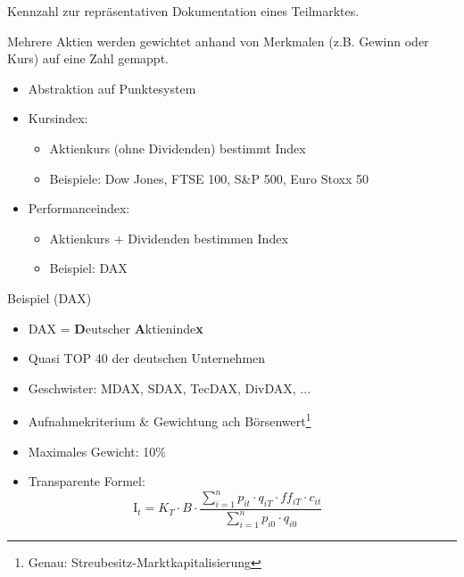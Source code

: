 \documentclass{beamer}
\begin{document}
			\begin{frame}
				\begin{definition}
					Kennzahl zur repräsentativen Dokumentation eines Teilmarktes.
				\end{definition}
				Mehrere Aktien werden gewichtet anhand von Merkmalen (z.B. Gewinn oder Kurs) auf eine Zahl gemappt.
			
				\begin{itemize}
					\item Abstraktion auf Punktesystem\pause
					\item Kursindex:
					\begin{itemize}
						\item Aktienkurs (ohne Dividenden) bestimmt Index
						\item Beispiele: Dow Jones, FTSE 100, S\&P 500, Euro Stoxx 50
					\end{itemize}\pause
					\item Performanceindex:
					\begin{itemize}
						\item Aktienkurs + Dividenden bestimmen Index
						\item Beispiel: DAX
					\end{itemize}
				\end{itemize}
			\end{frame}
		
			\begin{frame}{Beispiel (DAX)}
				\begin{itemize}
					\item DAX = \textbf{D}eutscher \textbf{A}ktieninde\textbf{x}\citewiki{DAX}
					\item Quasi TOP 40 der deutschen Unternehmen
					\item Geschwister: MDAX, SDAX, TecDAX, DivDAX, ...
					\item Aufnahmekriterium \& Gewichtung ach Börsenwert\footnote{Genau: Streubesitz-Marktkapitalisierung}
					\item Maximales Gewicht: 10\%
					\item Transparente Formel:\pause
					\[
						\text{I}_t = K_T \cdot B \cdot \frac
						{
							\sum_{i=1}^{n} p_{it} \cdot q_{iT} \cdot ff_{iT} \cdot c_{it}
						}
						{
							\sum_{i=1}^{n} p_{i0} \cdot q_{i0}
						}\hspace{1cm}
					\]
				\end{itemize}
			\end{frame}
		
\end{document}

